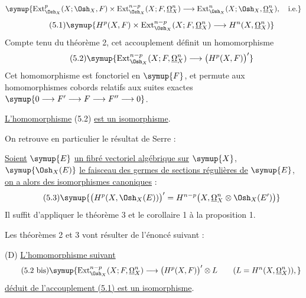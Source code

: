 \[
\symup{\operatorname{Ext}_{\Osh_X}^{p}(X;\Osh_X,F)
\times\operatorname{Ext}_{\Osh_X}^{n-p}(X;F,\underline{\Omega}_X^{n})
\longrightarrow
\operatorname{Ext}_{\Osh_X}^{n}(X;\Osh_X,\underline{\Omega}_X^{n}),\quad\text{i.e.}}
\]
\begin{equation}\tag{5.1}
  \symup{H^{p}(X,F)
  \times\operatorname{Ext}_{\Osh_X}^{n-p}(X;F,\underline{\Omega}_X^{n})
  \longrightarrow H^{n}(X,\underline{\Omega}_X^{n})}
\end{equation}
Compte tenu du théorème 2, cet accouplement définit un homomorphisme
\begin{equation}\tag{5.2}
  \symup{\operatorname{Ext}_{\Osh_X}^{n-p}(X;F,\underline{\Omega}_X^{n})
  \longrightarrow\bigl(H^{p}(X,F)\bigr)'}
\end{equation}
Cet homomorphisme est fonctoriel en $\symup{F}$, et permute aux homomorphismes cobords
relatifs aux suites exactes $\symup{0\longrightarrow F'\longrightarrow F
\longrightarrow F''\longrightarrow0}$.

 \uline{L'homomorphisme} (5.2) \uline{est un isomorphisme}.

On retrouve en particulier le résultat de Serre :

 \uline{Soient} $\symup{E}$ \uline{un fibré vectoriel algébrique sur} $\symup{X}$,
$\symup{\Osh_X(E)}$ \uline{le faisceau des germes de sections régulières de} $\symup{E}$, \uline{on a alors des
isomorphismes canoniques} :
\begin{equation}\tag{5.3}
  \symup{\bigl(H^{p}(X,\Osh_X(E))\bigr)'
  =H^{n-p}\bigl(X,\underline{\Omega}_X^{n}\otimes\Osh_X(E')\bigr)}
\end{equation}
Il suffit d'appliquer le théorème 3 et le corollaire 1 à la proposition 1.

Les théorèmes 2 et 3 vont résulter de l'énoncé suivant :

\noindent(D) \uline{L'homomorphisme suivant}
\begin{equation}\tag{5.2 bis}
  \symup{\operatorname{Ext}_{\Osh_X}^{n-p}(X;F,\underline{\Omega}_X^{n})
  \longrightarrow\bigl(H^{p}(X,F)\bigr)'\otimes L
  \qquad (L=H^{n}(X,\underline{\Omega}_X^{n})),}
\end{equation}
\uline{déduit de l'accouplement (5.1) est un isomorphisme}.

